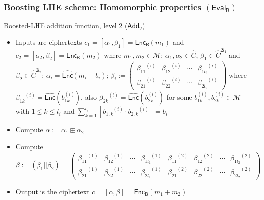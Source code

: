 \documentclass{beamer}
\begin{document}
\begin{frame}[t]
\frametitle{Boosting LHE scheme: Homomorphic properties $(\mathsf{Eval_{B}})$}

\begin{block}{Boosted-LHE addition function, level 2 ($\mathsf{Add_2}$)}
\begin{itemize}
\item Inputs are ciphertexts $c_1=[\alpha_1,\beta_1]=\mathsf{Enc_B}(m_1)$ and $c_2=[\alpha_2,\beta_2]=\mathsf{Enc_B}(m_2)$ where $m_1,m_2 \in \mathcal{M}$; $\alpha_1, \alpha_2 \in \widehat{C},\, \beta_1 \in {\widehat{C}}^{2l_1}$ and $\beta_2 \in {\widehat{C}}^{2l_2}$; $\alpha_i=\widehat{\mathsf{Enc}}(m_i-b_i)$; $\beta_i:=  \left(\begin{array}{cccc} {\beta_{11}}^{(i)} & {\beta_{12}}^{(i)} & \cdots & {\beta_{1l_i}}^{(i)} \\ {\beta_{21}}^{(i)} & {\beta_{22}}^{(i)} & \cdots & {\beta_{2l_i}}^{(i)} \end{array} \right)$ where ${\beta_{1k}}^{(i)}=\widehat{\mathsf{Enc}}{(b_{1k}^{(i)})}$, also ${\beta_{2k}}^{(i)}=\widehat{\mathsf{Enc}}{(b_{2k}^{(i)})}$ for some $b_{1k}^{(i)},b_{2k}^{(i)} \in \mathcal{M}$ with $1 \leq k \leq  l_i$ and $\sum_{k=1}^{l_i}[{b_{1,k}}^{(i)} \cdot {b_{2,k}}^{(i)}]=b_i$
\item Compute  $\alpha := \alpha_1 \boxplus \alpha_2 $ 
\item Compute  $\beta :=(\beta_1 || \beta_2)=\left(\begin{array}{cccccccc} {\beta_{11}}^{(1)} & {\beta_{12}}^{(1)} & \cdots & {\beta_{1l_1}}^{(1)} & {\beta_{11}}^{(2)} & {\beta_{12}}^{(2)} & \cdots & {\beta_{1l_2}}^{(2)} \\ {\beta_{21}}^{(1)} & {\beta_{22}}^{(1)} & \cdots & {\beta_{2l_1}}^{(1)}   & {\beta_{21}}^{(2)} & {\beta_{22}}^{(2)} & \cdots & {\beta_{2l_2}}^{(2)} \end{array} \right)$
\item Output is the ciphertext $c=[\alpha,\beta]= \mathsf{Enc_B}(m_1+m_2)$
\end{itemize} 
\end{block}
\end{frame}
\end{document}
